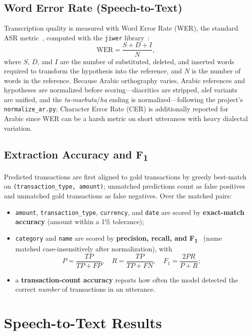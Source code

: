 \subsection{Word Error Rate (Speech-to-Text)}

Transcription quality is measured with Word Error Rate (WER), the standard ASR
metric~\cite{morris2004wer}, computed with the \texttt{jiwer}
library~\cite{jiwer}:
\[
\text{WER} = \frac{S + D + I}{N},
\]
where $S$, $D$, and $I$ are the number of substituted, deleted, and inserted
words required to transform the hypothesis into the reference, and $N$ is the
number of words in the reference. Because Arabic orthography varies, Arabic
references and hypotheses are normalized before scoring---diacritics are stripped,
alef variants are unified, and the \emph{ta-marbuta}/\emph{ha} ending is
normalized---following the project's \texttt{normalize\_ar.py}; Character Error
Rate (CER) is additionally reported for Arabic since WER can be a harsh metric
on short utterances with heavy dialectal variation.

\subsection{Extraction Accuracy and F\textsubscript{1}}

Predicted transactions are first aligned to gold transactions by greedy
best-match on \texttt{(transaction\_type, amount)}; unmatched predictions count
as false positives and unmatched gold transactions as false negatives. Over the
matched pairs:

\begin{itemize}[leftmargin=1.4em]
    \item \texttt{amount}, \texttt{transaction\_type}, \texttt{currency}, and
    \texttt{date} are scored by \textbf{exact-match accuracy} (amount within a
    1\% tolerance);
    \item \texttt{category} and \texttt{name} are scored by
    \textbf{precision, recall, and F\textsubscript{1}}~\cite{powers2011fmeasure}
    (name matched case-insensitively after normalization), with
    \[
    P=\frac{TP}{TP+FP}, \quad R=\frac{TP}{TP+FN}, \quad F_1=\frac{2PR}{P+R};
    \]
    \item a \textbf{transaction-count accuracy} reports how often the model
    detected the correct \emph{number} of transactions in an utterance.
\end{itemize}

\section{Speech-to-Text Results}

